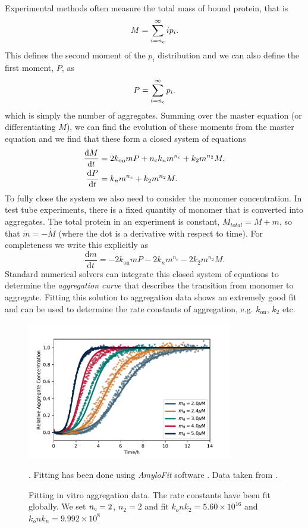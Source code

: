 Experimental methods  often measure the total mass of bound protein, that is
\begin{equation}
    M = \sum_{i=n_{\mathrm{c}}}^{\infty}i p_i.
\end{equation}
This defines the second moment of the $p_i$ distribution and we can also define the first moment, $P$, as 
\begin{equation}
    P = \sum_{i=n_{\mathrm{c}}}^{\infty} p_i.
\end{equation}
which is simply the number of aggregates. Summing over the master equation (or differentiating $M$), we can find the evolution of these moments from the master equation and  we find that these form a closed system of equations
\begin{align}
    \frac{\text{d}M}{\text{d}t} &= 2 k_\text{on}m P + n_{\mathrm{c}} k_n m^{n_{\mathrm{c}}}+ k_2 m^{n_2} M, \label{eq:4-Mvitro} \\
    \frac{\text{d}P}{\text{d}t} &= k_n m^{n_c}+k_2 m^{n_2} M. \label{eq:4-Pvitro}
\end{align}
To fully close the system we also need to consider the monomer concentration. In test tube experiments, there is a fixed quantity of monomer that is converted into aggregates. The total protein in an experiment is constant, $M_{total} = M + m$, so that $\dot{m}=-\dot{M}$ (where the dot is a derivative with respect to time). For completeness we write this explicitly as 
\begin{equation}
    \frac{\text{d}m}{\text{d}t} = -2 k_\text{on}m P - 2k_n m^{n_c} - 2k_2 m^{n_2} M. \label{eq:4-mvitro}
\end{equation}
Standard numerical solvers can integrate this closed system of equations to determine the \textit{aggregation curve} that describes the transition from monomer to aggregate. Fitting this solution to aggregation data shows an extremely good fit and can be used to determine the rate constants of aggregation, e.g. $k_\text{on}$, $k_2$ etc.

\begin{figure}
    \centering
    \includegraphics[width=0.8\textwidth]{figures/invitroDemo.pdf}
    \caption{Fitting in vitro aggregation data. The rate constants have been fit globally. We set $n_{\mathrm{c}}=2$, $n_2=2$ and fit $k_on k_2=5.60\times10^{16}$ and $k_on k_n=9.992\times10^{8}$}. Fitting has been done using \textit{AmyloFit} software \cite{meisl_molecular_2016}. Data taken from \cite{cohen_proliferation_2013}.
    \label{fig:4-invitro}
\end{figure}

